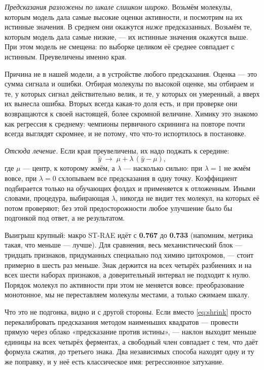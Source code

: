 \emph{Предсказания разложены по шкале слишком широко.} Возьмём молекулы, которым модель
дала самые высокие оценки активности, и посмотрим на их истинные значения. В среднем они
окажутся \emph{ниже} предсказанных. Возьмём те, которым модель дала самые низкие, --- их
истинные значения окажутся выше. При этом модель не смещена: по выборке целиком её среднее
совпадает с истинным. Преувеличены именно края.

Причина не в нашей модели, а в устройстве любого предсказания. Оценка --- это сумма сигнала
и ошибки. Отбирая молекулы по высокой оценке, мы отбираем и те, у которых сигнал
действительно велик, и те, у которых он умеренный, а вверх их вынесла ошибка. Вторых всегда
какая-то доля есть, и при проверке они возвращаются к своей настоящей, более скромной
величине. Химику это знакомо как регрессия к среднему: чемпионы первичного скрининга на
повторе почти всегда выглядят скромнее, и не потому, что что-то испортилось в постановке.

\emph{Отсюда лечение.} Если края преувеличены, их надо поджать к середине:
\begin{equation}
\hat y \;\to\; \mu + \lambda\,(\hat y - \mu),
\label{eq:shrink}
\end{equation}
где $\mu$ --- центр, к которому жмём, а $\lambda$ --- насколько сильно: при $\lambda = 1$ не
жмём вовсе, при $\lambda = 0$ схлопываем все предсказания в одну точку. Коэффициент
подбирается только на обучающих фолдах и применяется к отложенным. Иными словами, процедура,
выбирающая $\lambda$, никогда не видит тех молекул, на которых её потом проверяют; без этой
предосторожности любое улучшение было бы подгонкой под ответ, а не результатом.

Выигрыш крупный: макро ST-RAE идёт с \textbf{0.767} до \textbf{0.733} (напомним, метрика
такая, что меньше --- лучше). Для сравнения, весь механистический блок --- тридцать
признаков, придуманных специально под химию цитохромов, --- стоит примерно в шесть раз
меньше. Знак держится на всех четырёх разбиениях и на всех шести наборах признаков, а
доверительный интервал не подходит к нулю. Порядок молекул по активности при этом не
меняется вовсе: преобразование монотонное, мы не переставляем молекулы местами, а только
сжимаем шкалу.

Что это не подгонка, видно и с другой стороны. Если вместо \eqref{eq:shrink} просто
перекалибровать предсказания методом наименьших квадратов --- провести прямую через облако
«предсказание против истины», --- наклон выходит меньше единицы на всех четырёх ферментах, а
свободный член совпадает с тем, что даёт формула сжатия, до третьего знака. Два независимых
способа находят одну и ту же поправку, и у неё есть классическое имя: регрессионное
затухание.

